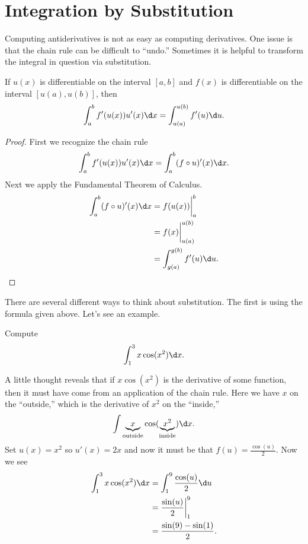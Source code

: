 \chapter{Integration by Substitution}

Computing antiderivatives is not as easy as computing derivatives. One
issue is that the chain rule can be difficult to ``undo.'' Sometimes 
it is helpful to transform the integral in question via substitution. 

\begin{mainTheorem} 
If $u(x)$ is differentiable on the interval $[a,b]$ and $f(x)$ is
differentiable on the interval $[u(a),u(b)]$, then
\[
\int_a^b f'(u(x)) u'(x) \d x =\int_{u(a)}^{u(b)} f'(u) \d u.
\]
\end{mainTheorem}
\begin{proof} First we recognize the chain rule
\[
\int_a^b f'(u(x)) u'(x) \d x = \int_a^b (f\circ u)'(x) \d x.
\]
Next we apply the Fundamental Theorem of Calculus. 
\begin{align*} 
\int_a^b (f\circ u)'(x) \d x &= f(u(x)) \bigg|_a^b \\
&= f(x) \bigg|_{u(a)}^{u(b)}\\ 
&= \int_{g(a)}^{g(b)} f'(u) \d u.
\end{align*}
\end{proof}


There are several different ways to think about substitution. The
first is using the formula given above. Let's see an example. 
\begin{example}
Compute
\[
\int_1^3 x\cos(x^2)\d x.
\]
\end{example}


\begin{solution}
A little thought reveals that if $x\cos(x^2)$ is the derivative of
some function, then it must have come from an application of the chain
rule. Here we have $x$ on the ``outside,'' which is the derivative of
$x^2$ on the ``inside,'' 
\[
\int \underbrace{x}_{\text{outside}}\cos(\underbrace{x^2}_{\text{inside}})\d x.
\]
Set $u(x) = x^2$ so $u'(x) = 2x$ and now it must be that $f(u) =
\frac{\cos(u)}{2}$. Now we see
\begin{align*}
\int_1^3 x\cos(x^2)\d x &= \int_1^9 \frac{\cos(u)}{2}\d u\\
&= \frac{\sin(u)}{2} \bigg|_1^9 \\
&= \frac{\sin(9) -\sin(1)}{2}.
\end{align*}
\end{solution}

